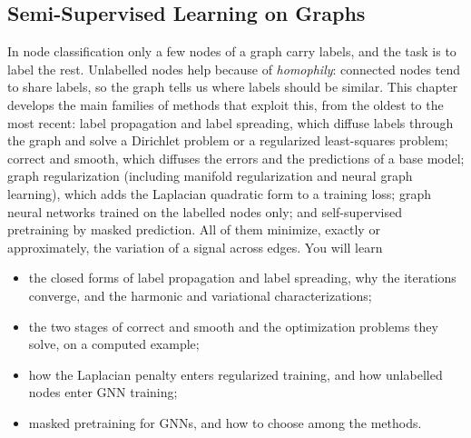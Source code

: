 \begin{notechapter}
\forgetcs\mask{}
\forgetcs\corr{}
\forgetcs\smooth{}
\providecommand{\argmax}{\operatorname*{argmax}}
\providecommand{\argmin}{\operatorname*{argmin}}
\chapter{Semi-Supervised Learning on Graphs}\label{ch:semi-supervised-graphs}

\begin{chapterintro}
In node classification only a few nodes of a graph carry labels, and the task is to label the rest. Unlabelled nodes help because of \emph{homophily}: connected nodes tend to share labels, so the graph tells us where labels should be similar. This chapter develops the main families of methods that exploit this, from the oldest to the most recent: label propagation and label spreading, which diffuse labels through the graph and solve a Dirichlet problem or a regularized least-squares problem; correct and smooth, which diffuses the errors and the predictions of a base model; graph regularization (including manifold regularization and neural graph learning), which adds the Laplacian quadratic form to a training loss; graph neural networks trained on the labelled nodes only; and self-supervised pretraining by masked prediction. All of them minimize, exactly or approximately, the variation of a signal across edges. You will learn
\begin{itemize}[nosep]
  \item the closed forms of label propagation and label spreading, why the iterations converge, and the harmonic and variational characterizations;
  \item the two stages of correct and smooth and the optimization problems they solve, on a computed example;
  \item how the Laplacian penalty enters regularized training, and how unlabelled nodes enter GNN training;
  \item masked pretraining for GNNs, and how to choose among the methods.
\end{itemize}
\end{chapterintro}


\end{notechapter}
